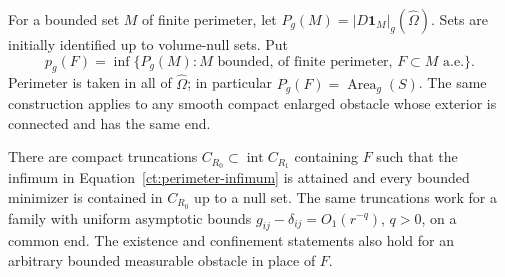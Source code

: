 For a bounded set $M$ of finite perimeter, let
$P_g(M)=|D\mathbf1_M|_g(\widehat\Omega)$. Sets are initially identified
up to volume-null sets. Put
\begin{equation}
\label{ct:perimeter-infimum}
 p_g(F)=\inf\{P_g(M):M\text{ bounded, of finite perimeter, }
                         F\subset M\text{ a.e.}\}.
\end{equation}
Perimeter is taken in all of $\widehat\Omega$; in particular
$P_g(F)=\operatorname{Area}_g(S)$.
The same construction applies to any smooth compact enlarged obstacle
whose exterior is connected and has the same end.

\begin{lemma}
\label{ct:confinement}
There are compact truncations
$C_{R_0}\subset\operatorname{int}C_{R_1}$ containing $F$ such that the
infimum in Equation~\ref{ct:perimeter-infimum} is attained and every
bounded minimizer is contained in $C_{R_0}$ up to a null set. The same
truncations work for a family with uniform asymptotic bounds
$g_{ij}-\delta_{ij}=O_1(r^{-q})$, $q>0$, on a common end.
The existence and confinement statements also hold for an arbitrary
bounded measurable obstacle in place of $F$.
\end{lemma}

